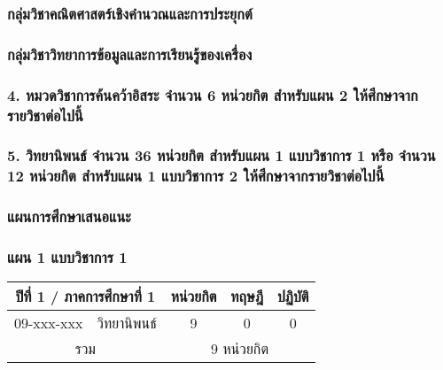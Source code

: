 \subsubsection*{กลุ่มวิชาคณิตศาสตร์เชิงคำนวณและการประยุกต์}



\subsubsection*{กลุ่มวิชาวิทยาการข้อมูลและการเรียนรู้ของเครื่อง}



\subsubsection*{4. หมวดวิชาการค้นคว้าอิสระ จำนวน 6 หน่วยกิต สำหรับแผน 2 ให้ศึกษาจากรายวิชาต่อไปนี้}



\subsubsection*{5. วิทยานิพนธ์ จำนวน 36 หน่วยกิต สำหรับแผน 1 แบบวิชาการ 1 หรือ จำนวน 12 หน่วยกิต สำหรับแผน 1 แบบวิชาการ 2 ให้ศึกษาจากรายวิชาต่อไปนี้}



\clearpage
\subsubsection{แผนการศึกษาเสนอแนะ}

\subsubsection*{แผน 1 แบบวิชาการ 1}


\renewcommand{\arraystretch}{1.4}
\begin{tabular}{|cp{}|ccc|}
\hline
\multicolumn{2}{|c|}{ปีที่ 1 / ภาคการศึกษาที่ 1} & \multicolumn{1}{c|}{หน่วยกิต} & \multicolumn{1}{c|}{ทฤษฎี} & \multicolumn{1}{c|}{ปฏิบัติ}  \\ \hline
\multicolumn{1}{|c|}{09-xxx-xxx}  & วิทยานิพนธ์  & \multicolumn{1}{c|}{9}        & \multicolumn{1}{c|}{0}     & \multicolumn{1}{c|}{0}                    \\ \hline
\multicolumn{2}{|c|}{รวม}                        & \multicolumn{3}{c|}{9 หน่วยกิต}                                                                            \\ \hline
\end{tabular}

